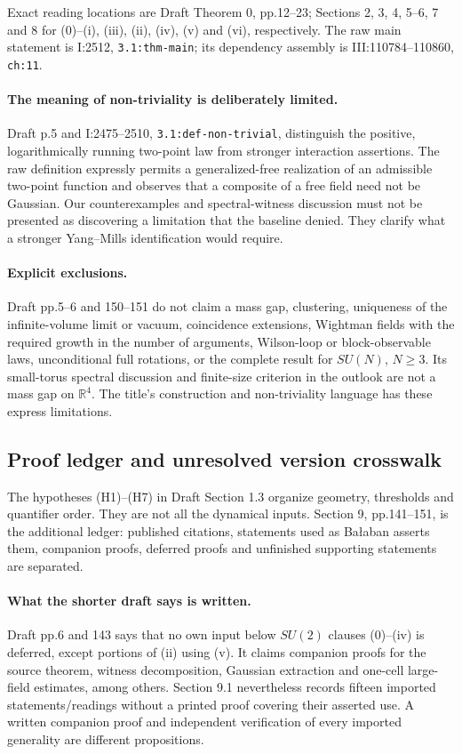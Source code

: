\documentclass[11pt]{article}
\providecommand{\hrbpath}[1]{\nolinkurl{#1}}
\theoremstyle{remark}
\begin{document}
Exact reading locations are Draft Theorem 0, pp.12--23;
Sections 2, 3, 4, 5--6, 7 and 8 for (0)--(i), (iii),
(ii), (iv), (v) and (vi), respectively. The raw main
statement is I:2512, \hrbpath{3.1:thm-main}; its dependency
assembly is III:110784--110860, \hrbpath{ch:11}.

\paragraph{The meaning of non-triviality is deliberately limited.}
Draft p.5 and I:2475--2510,
\hrbpath{3.1:def-non-trivial}, distinguish the positive,
logarithmically running two-point law from stronger
interaction assertions. The raw definition expressly
permits a generalized-free realization of an admissible
two-point function and observes that a composite of a free
field need not be Gaussian. Our counterexamples and
spectral-witness discussion must not be presented as
discovering a limitation that the baseline denied.
They clarify what a stronger Yang--Mills identification
would require.

\paragraph{Explicit exclusions.}
Draft pp.5--6 and 150--151 do not claim a mass gap,
clustering, uniqueness of the infinite-volume limit or
vacuum, coincidence extensions, Wightman fields with the
required growth in the number of arguments, Wilson-loop
or block-observable laws, unconditional full rotations,
or the complete result for \(SU(N)\), \(N\geq3\).
Its small-torus spectral discussion and finite-size
criterion in the outlook are not a mass gap on
\(\mathbb R^4\). The title's construction and
non-triviality language has these express limitations.

\subsection{Proof ledger and unresolved version crosswalk}
\label{hrb-ledger}

The hypotheses (H1)--(H7) in Draft Section 1.3 organize
geometry, thresholds and quantifier order. They are not
all the dynamical inputs. Section 9, pp.141--151, is the
additional ledger: published citations, statements used
as Ba{\l}aban asserts them, companion proofs, deferred
proofs and unfinished supporting statements are separated.

\paragraph{What the shorter draft says is written.}
Draft pp.6 and 143 says that no own input below \(SU(2)\)
clauses (0)--(iv) is deferred, except portions of (ii)
using (v). It claims companion proofs for the source
theorem, witness decomposition, Gaussian extraction and
one-cell large-field estimates, among others.
Section 9.1 nevertheless records fifteen imported
statements/readings without a printed proof covering
their asserted use. A written companion proof and
independent verification of every imported generality
are different propositions.
\end{document}
